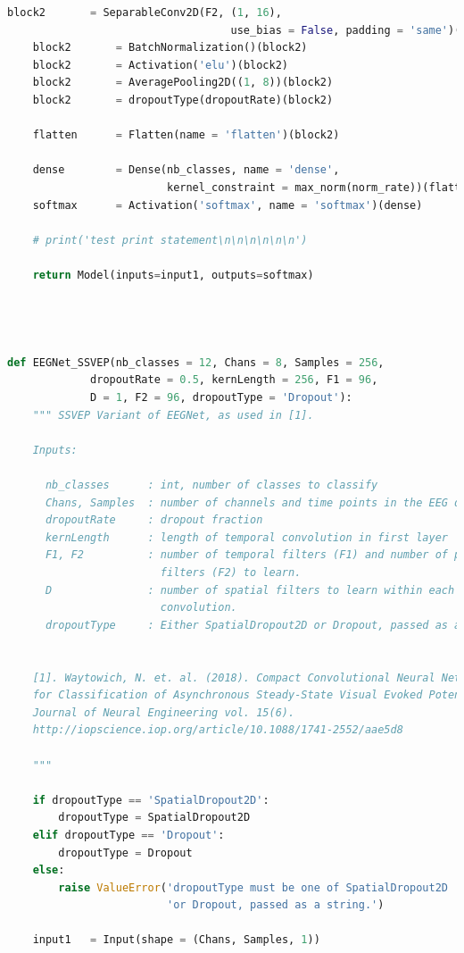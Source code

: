 \documentclass[conference]{IEEEtran}
\begin{document}
\begin{lstlisting}[language=Python, caption=Machine Learning Model, label=ml_model]
    block2       = SeparableConv2D(F2, (1, 16),
                                   use_bias = False, padding = 'same')(block1)
    block2       = BatchNormalization()(block2)
    block2       = Activation('elu')(block2)
    block2       = AveragePooling2D((1, 8))(block2)
    block2       = dropoutType(dropoutRate)(block2)
        
    flatten      = Flatten(name = 'flatten')(block2)
    
    dense        = Dense(nb_classes, name = 'dense', 
                         kernel_constraint = max_norm(norm_rate))(flatten)
    softmax      = Activation('softmax', name = 'softmax')(dense)

    # print('test print statement\n\n\n\n\n\n')
    
    return Model(inputs=input1, outputs=softmax)




def EEGNet_SSVEP(nb_classes = 12, Chans = 8, Samples = 256, 
             dropoutRate = 0.5, kernLength = 256, F1 = 96, 
             D = 1, F2 = 96, dropoutType = 'Dropout'):
    """ SSVEP Variant of EEGNet, as used in [1]. 

    Inputs:
        
      nb_classes      : int, number of classes to classify
      Chans, Samples  : number of channels and time points in the EEG data
      dropoutRate     : dropout fraction
      kernLength      : length of temporal convolution in first layer
      F1, F2          : number of temporal filters (F1) and number of pointwise
                        filters (F2) to learn. 
      D               : number of spatial filters to learn within each temporal
                        convolution.
      dropoutType     : Either SpatialDropout2D or Dropout, passed as a string.
      
      
    [1]. Waytowich, N. et. al. (2018). Compact Convolutional Neural Networks
    for Classification of Asynchronous Steady-State Visual Evoked Potentials.
    Journal of Neural Engineering vol. 15(6). 
    http://iopscience.iop.org/article/10.1088/1741-2552/aae5d8

    """
    
    if dropoutType == 'SpatialDropout2D':
        dropoutType = SpatialDropout2D
    elif dropoutType == 'Dropout':
        dropoutType = Dropout
    else:
        raise ValueError('dropoutType must be one of SpatialDropout2D '
                         'or Dropout, passed as a string.')
    
    input1   = Input(shape = (Chans, Samples, 1))


\end{lstlisting}
\end{document}
